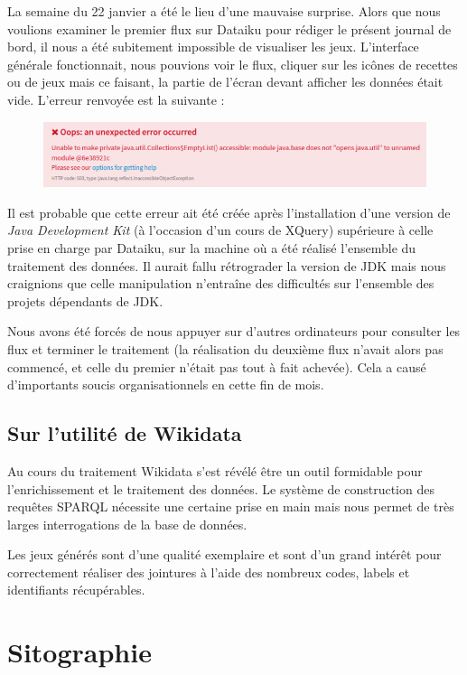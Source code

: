 \documentclass[hidelinks, 12pt]{report}
\begin{document}
La semaine du 22 janvier a été le lieu d'une mauvaise surprise. Alors que nous voulions examiner le premier flux sur Dataiku pour rédiger le présent journal de bord, il nous a été subitement impossible de visualiser les jeux. L'interface générale fonctionnait, nous pouvions voir le flux, cliquer sur les icônes de recettes ou de jeux mais ce faisant, la partie de l'écran devant afficher les données était vide. L'erreur renvoyée est la suivante :

\begin{center}
	\begin{figure}[H]
		\includegraphics[scale=0.49]{images/bogue.png}
	\end{figure}
\end{center}

Il est probable que cette erreur ait été créée après l'installation d'une version de \textit{Java Development Kit} (à l'occasion d'un cours de XQuery) supérieure à celle prise en charge par Dataiku, sur la machine où a été réalisé l'ensemble du traitement des données. Il aurait fallu rétrograder la version de JDK mais nous craignions que celle manipulation n'entraîne des difficultés sur l'ensemble des projets dépendants de JDK.

Nous avons été forcés de nous appuyer sur d'autres ordinateurs pour consulter les flux et terminer le traitement (la réalisation du deuxième flux n'avait alors pas commencé, et celle du premier n'était pas tout à fait achevée). Cela a causé d'importants soucis organisationnels en cette fin de mois.

\section{Sur l'utilité de Wikidata}

Au cours du traitement Wikidata s'est révélé être un outil formidable pour l'enrichissement et le traitement des données. Le système de construction des requêtes SPARQL nécessite une certaine prise en main mais nous permet de très larges interrogations de la base de données.

Les jeux générés sont d'une qualité exemplaire et sont d'un grand intérêt pour correctement réaliser des jointures à l'aide des nombreux codes, labels et identifiants récupérables.
\newpage





%





\chapter{Sitographie}
\printbibliography[heading=none]
\newpage

\tableofcontents

\end{document}
